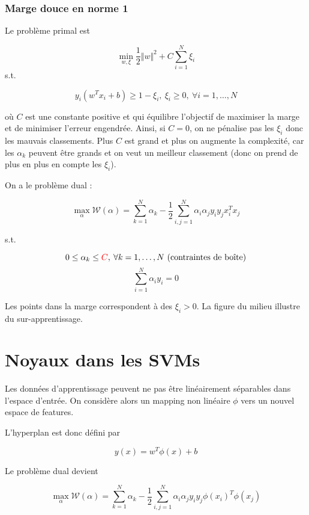 	\subsubsection{Marge douce en norme 1}
	
	Le problème primal est
	
	$$\min_{w, \xi} \frac{1}{2} \Vert w \Vert^2 + C \sum_{i = 1}^N \xi_i$$
	s.t.
	
	$$y_i(w^T x_i + b) \geq 1 - \xi_i, \: \xi_i \geq 0, \: \forall i = 1, \dots , N$$
	
	où $C$ est une constante positive et qui équilibre l'objectif de maximiser la marge et de minimiser l'erreur engendrée. Ainsi, si $C = 0$, on ne pénalise pas les $\xi_i$ donc les mauvais classements. Plus $C$ est grand et plus on augmente la complexité, car les $\alpha_k$ peuvent être grands et on veut un meilleur classement (donc on prend de plus en plus en compte les $\xi_i$).
	
	
	On a le problème dual :
	
	$$\max_\alpha \mathcal{W}(\alpha) = \sum_{k = 1}^N \alpha_k - \frac{1}{2} \sum_{i, j = 1}^N \alpha_i \alpha_j y_i y_j x_i^T x_j$$
	
	s.t.
	
	$$0 \leq \alpha_k \leq \textcolor{red}{C}, \: \forall k = 1, \dots , N \text{ (contraintes de boîte)}$$
	$$\sum_{i = 1}^N \alpha_i y_i = 0$$
	
	
	Les points dans la marge correspondent à des $\xi_i > 0$. La figure du milieu illustre du sur-apprentissage.
	
\section{Noyaux dans les SVMs}

Les données d'apprentissage peuvent ne pas être linéairement séparables dans l'espace d'entrée. On considère alors un mapping non linéaire $\phi$ vers un nouvel espace de features.


L'hyperplan est donc défini par

$$y(x) = w^T \phi(x) + b$$

Le problème dual devient

$$\max_\alpha \mathcal{W}(\alpha) = \sum_{k = 1}^N \alpha_k - \frac{1}{2} \sum_{i, j = 1}^N \alpha_i \alpha_j y_i y_j \phi(x_i)^T \phi(x_j)$$

